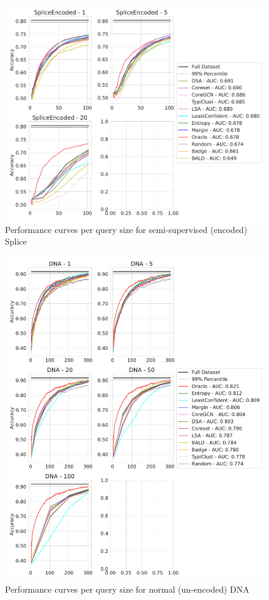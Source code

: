 \documentclass[]{article}
\begin{document}
\begin{figure}[H]
\centering
\caption{Performance curves per query size for semi-supervised (encoded) Splice}
\includegraphics[width=\linewidth]{img/eval_splice_enc}
\end{figure}
\begin{figure}[H]
    \centering
    \caption{Performance curves per query size for normal (un-encoded) DNA}
	\includegraphics[width=\linewidth]{img/eval_dna}
\end{figure}
\end{document}
